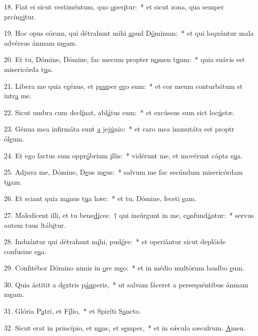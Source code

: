 18. Fiat ei sicut vestiméntum, quo \uline{o}per\uline{í}tur:~* et sicut zona, qua semper prcíng\uline{i}tur.\par 
19. Hoc opus eórum, qui détrahunt mihi \uline{a}pud D\uline{ó}minum:~* et qui loquúntur mala advérsus ánmam m\uline{e}am.\par 
20. Et tu, Dómine, Dómine, fac mecum propter n\uline{o}men t\uline{u}um:~* quia suávis est misericórda t\uline{u}a.\par 
21. Líbera me quia egénus, et p\uline{au}per \uline{e}go sum:~* et cor meum conturbátum st intr\uline{a} me.\par 
22. Sicut umbra cum decl\uline{í}nat, abl\uline{á}tus sum:~* et excússus sum sict loc\uline{ú}stæ.\par 
23. Génua mea infirmáta sunt \uline{a} jej\uline{ú}nio:~* et caro mea immutáta est proptr ól\uline{e}um.\par 
24. Et ego factus sum oppr\uline{ó}brium \uline{i}llis:~* vidérunt me, et movérunt cápta s\uline{u}a.\par 
25. Adjuva me, Dómine, D\uline{e}us m\uline{e}us:~* salvum me fac secúndum misericórdam t\uline{u}am.\par 
26. Et sciant quia m\uline{a}nus t\uline{u}a hæc:~* et tu, Dómine, fecsti \uline{e}am.\par 
27. Maledícent illi, et tu bene\uline{dí}ces:~† qui insúrgunt in me, c\uline{o}nfund\uline{á}ntur:~* servus autem tuus ltáb\uline{i}tur.\par 
28. Induántur qui détrahunt m\uline{i}hi, pud\uline{ó}re:~* et operiántur sicut deplóide confusine s\uline{u}a.\par 
29. Confitébor Dómino nimis in \uline{o}re m\uline{e}o:~* et in médio multórum laudbo \uline{e}um.\par 
30. Quia ástitit a d\uline{e}xtris p\uline{áu}peris,~* ut salvam fáceret a persequéntibus ánmam m\uline{e}am.\par 
31. Glória P\uline{a}tri, et F\uline{í}lio,~* et Spiríti S\uline{a}ncto.\par 
32. Sicut erat in princípio, et n\uline{u}nc, et s\uline{e}mper,~* et in sǽcula sæculrum. \uline{A}men.\par 
